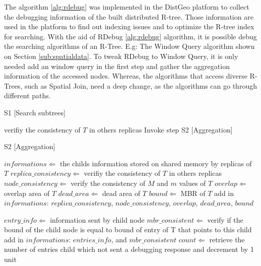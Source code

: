 	The algorithm \ref{alg:rdebug} was implemented in the DistGeo platform to collect the debugging information of the built distributed R-tree. Those information are used in the platform to find out indexing issues and to optimize the R-tree index for searching. With the aid of RDebug \ref{alg:rdebug} algorithm, it is possible debug the searching algorithms of an R-Tree. E.g: The Window Query algorithm shown on Section \ref{sub:spatialdata}. To tweak RDebug to Window Query, it is only needed add an window query in the first step and gather the aggregation information of the accessed nodes. Whereas, the algorithms that access diverse R-Trees, such as Spatial Join, need a deep change, as the algorithms can go through different paths.
		
\medskip
\begin{center}
\begin{minipage}{1\textwidth}
\begin{algorithm2e}[H]
\SetAlFnt{\small\sf}
 \DontPrintSemicolon
 \LinesNumbered
\SetAlgoLined
 \BlankLine
 \BlankLine
	
 S1 [Search subtrees]

{
  verifiy the consistency of $T$ in others replicas\;
	Invoke step S2 [Aggregation]\;
}

S2 [Aggregation]

$informations \Leftarrow$ the childs information stored on shared memory by replicas of $T$\;
$replica\_consistency \Leftarrow$ verifiy the consistency of $T$ in others replicas\;
$node\_consistency \Leftarrow$	verify the consistency of $M$ and $m$ values of  $T$\;
$overlap \Leftarrow$ overlap area of $T$\;
$dead\_area \Leftarrow$ dead area of $T$\;
$bound \Leftarrow$ MBR of $T$\;
add in $informations$: $replica\_consistency$, $node\_consistency$, $overlap$, $dead\_area$, $bound$\;

{
	  $entry\_info \Leftarrow$ information sent by child node\;
    $mbr\_consistent \Leftarrow$ verify if the bound of the child node is equal to bound of entry of T that points to this child\;
    add in $informations$: $entries\_info$, and $mbr\_consistent$\;
		$count \Leftarrow$ retrieve the number of entries child which not sent a debugging response and decrement by 1 unit\;
		
}
\end{algorithm2e}
\end{minipage}
\end{center}
